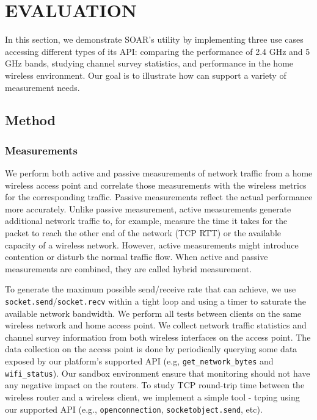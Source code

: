 \chapter{EVALUATION} 
\label{sec.evaluation}
In this section, we demonstrate SOAR's utility by implementing three use cases accessing different types of its API: comparing the performance of 2.4 GHz and 5 GHz bands, studying channel survey statistics, and performance in the home wireless environment. Our goal is to illustrate how \sysname can support a variety of measurement needs.
\section{Method}
\subsection{Measurements}
\label{ssec.measurements}

We perform both active and passive measurements of network traffic from a home wireless access point and correlate those measurements with the wireless metrics for the corresponding traffic. Passive measurements reflect the actual performance more accurately. Unlike passive measurement, active measurements generate additional network traffic to, for example, measure the time it takes for the packet to reach the other end of the network (TCP RTT) or the available capacity of a wireless network. However, active measurements might introduce contention or disturb the normal traffic flow. When active and passive measurements are combined, they are called hybrid measurement. 

To generate the maximum possible send/receive rate that \sysname can achieve, we use \texttt{socket.send}/\texttt{socket.recv} within a tight loop and using a timer to saturate the available network bandwidth. We perform all tests between clients on the same wireless network and home access point. We collect network traffic statistics and channel survey information from both wireless interfaces on the access point. The data collection on the access point is done by periodically querying some data exposed by our platform's supported API (e.g, \texttt{get\_network\_bytes} and \texttt{wifi\_status}). Our sandbox environment ensure that monitoring should not have any negative impact on the routers. To study TCP round-trip time between the wireless router and a wireless client, we implement a simple tool - tcping using our supported API (e.g., \texttt{openconnection}, \texttt{socketobject.send}, etc). 
 
